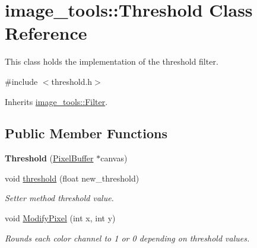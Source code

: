 \hypertarget{classimage__tools_1_1Threshold}{}\section{image\+\_\+tools\+:\+:Threshold Class Reference}
\label{classimage__tools_1_1Threshold}


This class holds the implementation of the threshold filter.  




{\ttfamily \#include $<$threshold.\+h$>$}



Inherits \hyperlink{classimage__tools_1_1Filter}{image\+\_\+tools\+::\+Filter}.

\subsection*{Public Member Functions}
\begin{DoxyCompactItemize}
\item 
{\bfseries Threshold} (\hyperlink{classimage__tools_1_1PixelBuffer}{Pixel\+Buffer} $\ast$canvas)\hypertarget{classimage__tools_1_1Threshold_aba16f75979bd9ba6a4630c904864074b}{}\label{classimage__tools_1_1Threshold_aba16f75979bd9ba6a4630c904864074b}

\item 
void \hyperlink{classimage__tools_1_1Threshold_acad916243fee2e0313e5240f81340fea}{threshold} (float new\+\_\+threshold)\hypertarget{classimage__tools_1_1Threshold_acad916243fee2e0313e5240f81340fea}{}\label{classimage__tools_1_1Threshold_acad916243fee2e0313e5240f81340fea}

\begin{DoxyCompactList}\small\item\em Setter method threshold value. \end{DoxyCompactList}\item 
void \hyperlink{classimage__tools_1_1Threshold_a84b6d9ff53919d4dff6d63b7f9c778d3}{Modify\+Pixel} (int x, int y)\hypertarget{classimage__tools_1_1Threshold_a84b6d9ff53919d4dff6d63b7f9c778d3}{}\label{classimage__tools_1_1Threshold_a84b6d9ff53919d4dff6d63b7f9c778d3}

\begin{DoxyCompactList}\small\item\em Rounds each color channel to 1 or 0 depending on threshold values. \end{DoxyCompactList}\end{DoxyCompactItemize}
